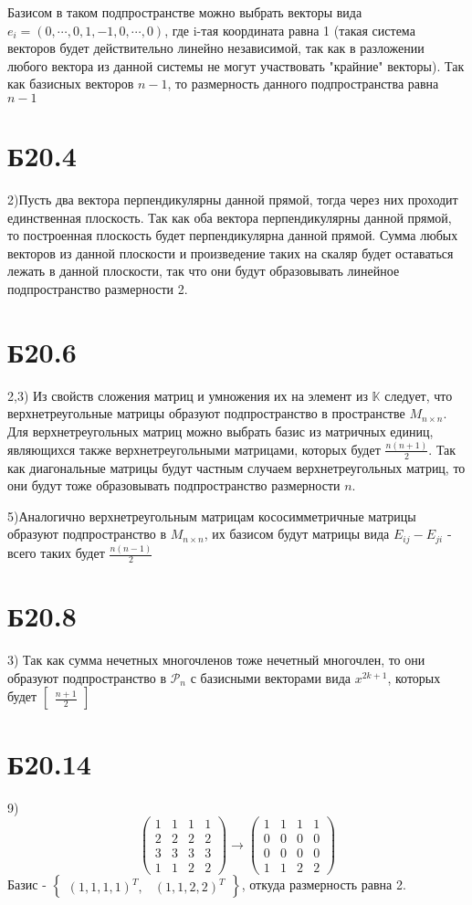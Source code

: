 \documentclass[a4paper,12pt]{article} %
\begin{document}
Базисом в таком подпространстве можно выбрать векторы вида $e_i=(0,\cdots,0,1,-1,0,\cdots,0)$, где i-тая координата равна 1 (такая система векторов будет действительно линейно независимой, так как в разложении любого вектора из данной системы не могут участвовать "крайние" векторы). Так как базисных векторов $n-1$, то размерность данного подпространства равна $n-1$
\section*{Б20.4}

2)Пусть два вектора перпендикулярны данной прямой, тогда через них проходит единственная плоскость. Так как оба вектора перпендикулярны данной прямой, то построенная плоскость будет перпендикулярна данной прямой. Сумма любых векторов из данной плоскости и произведение таких на скаляр будет оставаться лежать в данной плоскости, так что они будут образовывать линейное подпространство размерности 2.
\section*{Б20.6}\label{Б20.6}

2,3) Из свойств сложения матриц и умножения их на элемент из $\mathbb{K}$ следует, что верхнетреугольные матрицы образуют подпространство в пространстве $M_{n\times n}$. Для верхнетреугольных матриц можно выбрать базис из матричных единиц, являющихся также верхнетреугольными матрицами, которых будет $\frac{n(n+1)}{2}$. Так как диагональные матрицы будут частным случаем верхнетреугольных матриц, то они будут тоже образовывать подпространство размерности $n$.

5)Аналогично верхнетреугольным матрицам кососимметричные матрицы образуют подпространство в $M_{n\times n}$, их базисом будут матрицы вида $E_{ij}-E_{ji}$ - всего таких будет $\frac{n(n-1)}{2}$
\section*{Б20.8}3)
Так как сумма нечетных многочленов тоже нечетный многочлен, то они образуют подпространство в $\mathcal{P}_n$ с базисными векторами вида $x^{2k+1}$, которых будет $\begin{bmatrix}\frac{n+1}{2}\end{bmatrix}$
\section*{Б20.14}9)
$$\begin{pmatrix*}
    1&1&1&1\\
    2&2&2&2\\
    3&3&3&3\\
    1&1&2&2
\end{pmatrix*}\rightarrow
\begin{pmatrix*}
    1&1&1&1\\
    0&0&0&0\\
    0&0&0&0\\
    1&1&2&2
\end{pmatrix*}$$
Базис - $\begin{Bmatrix}(1,1,1,1)^{T},&(1,1,2,2)^{T}\end{Bmatrix}$, откуда размерность равна 2.
\end{document}
